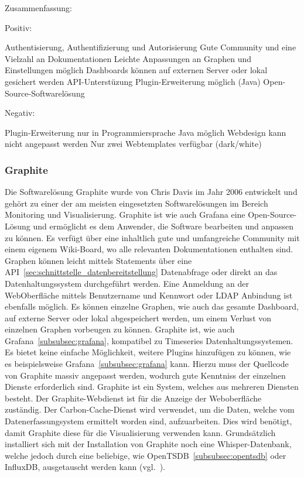 Zusammenfassung:

Positiv:

\begin{outline}
  \1 Authentisierung, Authentifizierung und Autorisierung
  \1 Gute Community und eine Vielzahl an Dokumentationen
  \1 Leichte Anpassungen an Graphen und Einstellungen möglich
  \1 Dashboards können auf externen Server oder lokal gesichert werden
  \1 API-Unterstüzung
  \1 Plugin-Erweiterung möglich (Java)
  \1 Open-Source-Softwarelösung
\end{outline}

Negativ:

\begin{outline}
  \1 Plugin-Erweiterung nur in Programmiersprache Java möglich
  \1 Webdesign kann nicht angepasst werden
  \1 Nur zwei Webtemplates verfügbar (dark/white)
\end{outline}
\mr%

\subsubsection{Graphite}
\label{subsubsec:graphite}
Die Softwarelösung Graphite wurde von Chris Davis im Jahr 2006 entwickelt und
gehört zu einer der am meisten eingesetzten Softwarelösungen im Bereich
Monitoring und Visualisierung. Graphite ist wie auch Grafana eine
Open-Source-Lösung und ermöglicht es dem Anwender, die Software bearbeiten und
anpassen zu können. Es verfügt über eine inhaltlich gute und umfangreiche
Community mit einem eigenem Wiki-Board, wo alle relevanten Dokumentationen
enthalten sind. Graphen können leicht mittels Statements über eine
API~\ref{sec:schnittstelle_datenbereitstellung} Datenabfrage oder direkt an das
Datenhaltungssystem durchgeführt werden. Eine Anmeldung an der WebOberfläche
mittels Benutzername und Kennwort oder \gls{LDAP} Anbindung ist ebenfalls
möglich. Es können einzelne Graphen, wie auch das gesamte Dashboard, auf
externe Server oder lokal abgespeichert werden, um einem Verlust von einzelnen
Graphen vorbeugen zu können. Graphite ist, wie auch
Grafana~\ref{subsubsec:grafana}, kompatibel zu Timeseries
Datenhaltungssystemen. Es bietet keine einfache Möglichkeit, weitere Plugins
hinzufügen zu können, wie es beispielsweise Grafana~\ref{subsubsec:grafana}
kann. Hierzu muss der Quellcode von Graphite massiv angepasst werden, wodurch
gute Kenntniss der einzelnen Dienste erforderlich sind. Graphite ist ein
System, welches aus mehreren Diensten besteht. Der Graphite-Webdienst ist für
die Anzeige der Weboberfläche zuständig. Der Carbon-Cache-Dienst wird
verwendet, um die Daten, welche vom Datenerfassungsystem ermittelt worden sind,
aufzuarbeiten. Dies wird benötigt, damit Graphite diese für die Visualisierung
verwenden kann. Grundsätzlich installiert sich mit der Installation von
Graphite noch eine Whisper-Datenbank, welche jedoch durch eine beliebige, wie
OpenTSDB~\ref{subsubsec:opentsdb} oder InfluxDB, ausgetauscht werden
kann (vgl.~\cite{graphite}).

